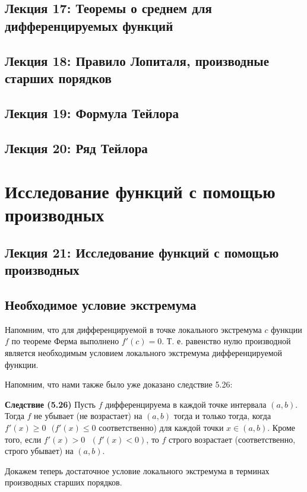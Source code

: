 	\section*{Лекция 17: Теоремы о среднем для дифференцируемых функций}
	
	\section*{Лекция 18: Правило Лопиталя, производные старших порядков}
	
	\section*{Лекция 19: Формула Тейлора}
	
	\section*{Лекция 20: Ряд Тейлора}
	
	\chapter{Исследование функций с помощью производных}
	
	\section*{Лекция 21: Исследование функций с помощью производных}
	
	\section{Необходимое условие экстремума}
	
	Напомним, что для дифференцируемой в точке локального экстремума $c$ функции $f$ по теореме Ферма выполнено $f'(c) = 0$. Т. е. равенство нулю производной является необходимым условием локального экстремума дифференцируемой функции. 
	
	Напомним, что нами также было уже доказано следствие 5.26:
	
	\textbf{Следствие (5.26)} Пусть $f$ дифференцируема в каждой точке интервала $(a, b)$. Тогда $f$ не
	убывает (не возрастает) на $(a, b)$ тогда и только тогда, когда $f'(x) \geqslant 0 \text{ } (f'(x) \leqslant 0$ соответственно) для каждой точки $x \in (a, b)$. Кроме того, если $f'(x) > 0 \text{ } (f'(x) < 0)$, то $f$ строго возрастает (соответственно, строго убывает) на $(a, b)$.
	
	Докажем теперь достаточное условие локального экстремума в терминах производных старших порядков.
	
